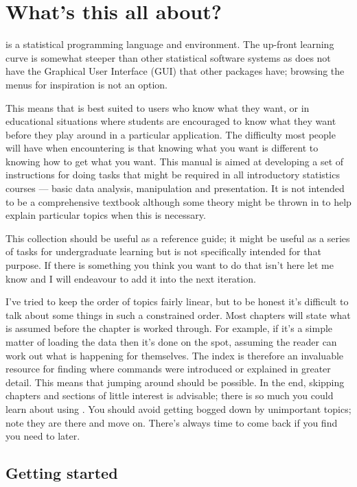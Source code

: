 
\chapter{What's this all about?}
\label{Intro}



\R{} is a statistical programming language and environment. The up-front learning curve is somewhat steeper than other statistical software systems as \R{} does not have the Graphical User Interface (GUI) that other packages have; browsing the menus for inspiration is not an option.

This means that \R{} is best suited to users who know what they want, or in educational situations where students are encouraged to know what they want before they play around in a particular application. The difficulty most people will have when encountering \R{} is that knowing what you want is different to knowing how to get what you want. This manual is aimed at developing a set of instructions for doing tasks that might be required in all introductory statistics courses --- basic data analysis, manipulation and presentation. It is not intended to be a comprehensive textbook although some theory might be thrown in to help explain particular topics when this is necessary.

This collection should be useful as a reference guide; it might be useful as a series of tasks for undergraduate learning but is not specifically intended for that purpose. If there is something you think you want to do that isn't here let me know and I will endeavour to add it into the next iteration.

I've tried to keep the order of topics fairly linear, but to be honest it's difficult to talk about some things in such a constrained order. Most chapters will state what is assumed before the chapter is worked through. For example, if it's a simple matter of loading the data then it's done on the spot, assuming the reader can work out what is happening for themselves. The index is therefore an invaluable resource for finding where commands were introduced or explained in greater detail. This means that jumping around should be possible. 
In the end, skipping chapters and sections of little interest is advisable; there is so much you could learn about using \R{}. You should avoid getting bogged down by unimportant topics; note they are there and move on. There's always time to come back if you find you need to later.

\section{Getting started}

